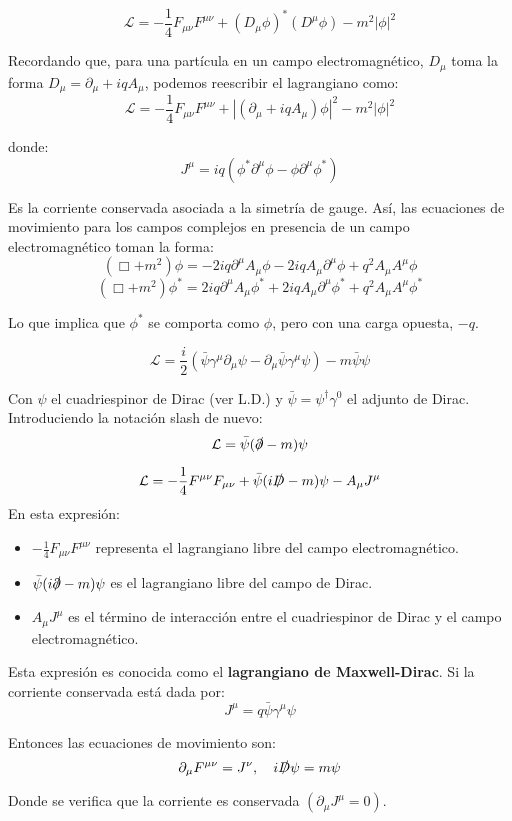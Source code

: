 \begin{example}
  $$
    \mathcal{L} = -\frac{1}{4} F_{\mu\nu} F^{\mu\nu} + (D_\mu \phi)^* (D^\mu \phi) - m^2 |\phi|^2
    $$

    Recordando que, para una partícula en un campo electromagnético, $D_\mu$ toma la forma $D_\mu = \partial_\mu + iq A_\mu$, podemos reescribir el lagrangiano como:
    $$
    \mathcal{L} = -\frac{1}{4} F_{\mu\nu} F^{\mu\nu} + |(\partial_\mu + iq A_\mu) \phi|^2 - m^2 |\phi|^2
    $$

    donde:
    $$
    J^\mu = iq (\phi^* \partial^\mu \phi - \phi \partial^\mu \phi^*)
    $$

    Es la corriente conservada asociada a la simetría de gauge. Así, las ecuaciones de movimiento para los campos complejos en presencia de un campo electromagnético toman la forma:
    $$
    (\Box + m^2) \phi = -2iq \partial^\mu A_\mu \phi - 2iq A_\mu \partial^\mu \phi + q^2 A_\mu A^\mu \phi
    $$
    $$
    (\Box + m^2) \phi^* = 2iq \partial^\mu A_\mu \phi^* + 2iq A_\mu \partial^\mu \phi^* + q^2 A_\mu A^\mu \phi^*
    $$

    Lo que implica que $\phi^*$ se comporta como $\phi$, pero con una carga opuesta, $-q$.
\end{example}
\begin{example}
  $$
  \mathcal{L} = \frac{i}{2} (\bar{\psi} \gamma^\mu \partial_\mu \psi - \partial_\mu \bar{\psi} \gamma^\mu \psi) - m \bar{\psi} \psi
  $$

  Con $\psi$ el cuadriespinor de Dirac (ver L.D.) y $\bar{\psi} = \psi^\dagger \gamma^0$ el adjunto de Dirac. Introduciendo la notación slash de nuevo:
  $$
  \mathcal{L} = \bar{\psi} (\slashed{\partial} - m) \psi
  $$
\end{example}
\begin{example}
  $$
    \mathcal{L} = -\frac{1}{4} F^{\mu\nu} F_{\mu\nu} + \bar{\psi} (i \slashed{D} - m) \psi - A_\mu J^\mu
    $$
    En esta expresión:

\begin{itemize}

    \item $-\frac{1}{4} F_{\mu\nu} F^{\mu\nu}$ representa el lagrangiano libre del campo electromagnético.
    
    \item $\bar{\psi} (i \slashed{\partial} - m) \psi$ es el lagrangiano libre del campo de Dirac.
    
    \item $A_\mu J^\mu$ es el término de interacción entre el cuadriespinor de Dirac y el campo electromagnético.

\end{itemize}
Esta expresión es conocida como el \textbf{lagrangiano de Maxwell-Dirac}. Si la corriente conservada está dada por:
$$
J^\mu = q \bar{\psi} \gamma^\mu \psi
$$

Entonces las ecuaciones de movimiento son:
$$
\partial_\mu F^{\mu\nu} = J^\nu, \quad i\slashed{D} \psi = m \psi
$$

Donde se verifica que la corriente es conservada $(\partial_\mu J^\mu = 0)$.
\end{example}
